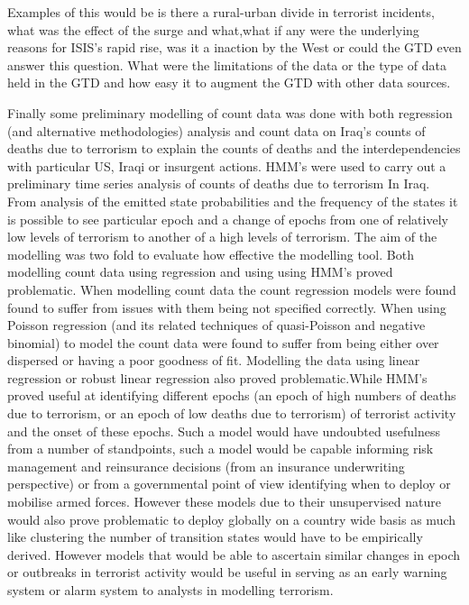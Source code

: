 Examples of this would be is there a rural-urban divide in terrorist incidents, 
what was the effect of the surge and what,what if any were the underlying reasons for ISIS's rapid rise, was it a inaction by the West or could the GTD even answer this question. What were the limitations of the data or the type of data held in the GTD and how easy it to augment the GTD with other data sources.

Finally some preliminary modelling of count data was done with both regression (and alternative methodologies) analysis and count data on Iraq's counts of deaths due to terrorism to explain the counts of deaths and the interdependencies with particular US, Iraqi or insurgent actions. HMM's were used to carry out a preliminary time series analysis of counts of deaths due to terrorism In Iraq. From analysis of the emitted state probabilities and the frequency of the states it is possible to see particular epoch and a change of epochs from one of relatively low levels of terrorism to another of a high levels of terrorism. The aim of the modelling was two fold to evaluate how effective the modelling tool. Both modelling count data using regression and using using HMM's proved problematic. When modelling count data the count regression models were found found to suffer from issues with them being not specified correctly.  When using Poisson regression (and its related techniques of quasi-Poisson and negative binomial) to model the count data were found to suffer from being either over dispersed or having a poor goodness of fit. Modelling the data using linear regression or robust linear regression also proved problematic.While HMM's proved useful at identifying different epochs (an epoch of high numbers of deaths due to terrorism, or an epoch of low deaths due to terrorism) of terrorist activity and the onset of these epochs. Such a model would have undoubted usefulness from a number of standpoints, such a model would be capable informing risk management and reinsurance decisions (from an insurance underwriting perspective) or from a governmental point of view identifying when to deploy or mobilise armed forces. However these models due to their unsupervised nature would also prove problematic to deploy globally on a country wide basis as much like clustering the number of transition states would have to be empirically derived. However models that would be able to ascertain similar changes in epoch or outbreaks in terrorist activity would be useful in serving as an early warning system or alarm system to analysts in modelling terrorism. 


